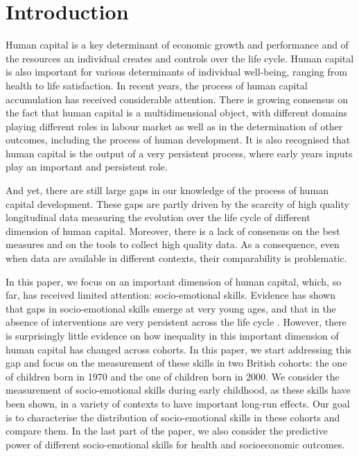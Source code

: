 \section{Introduction}

Human capital is a key determinant of economic growth and performance and of the resources an individual creates and controls over the life cycle. Human capital is also important for various determinants of individual well-being, ranging from health to life satisfaction.  In recent years, the process of human capital accumulation has received considerable attention. There is growing consensus on the fact that human capital is a multidimensional object, with different domains playing different roles in labour market as well as in the determination of other outcomes, including the process of human development. It is also recognised that human capital is the output of a very persistent process, where early years inputs play an important and persistent role.

And yet, there are still large gaps in our knowledge of the process of human capital development. These gaps are partly driven by the scarcity of high quality longitudinal data measuring the evolution over the life cycle of different dimension of human capital. Moreover, there is a lack of consensus on the best measures and on the tools to collect high quality data. As a consequence, even when data are available in different contexts, their comparability is problematic.

In this paper, we focus on an important dimension of human capital, which, so far, has received limited attention: socio-emotional skills. Evidence has shown that gaps in socio-emotional skills emerge at very young ages, and that in the absence of interventions are very persistent across the life cycle \citep{Cunha2006}. However, there is surprisingly little evidence on how inequality in this important dimension of human capital has changed across cohorts. In this paper, we start addressing this gap and focus on the measurement of these skills in two British cohorts: the one of children born in 1970 and the one of children born in 2000. We consider the measurement of socio-emotional skills during early childhood, as these skills have been shown, in a variety of contexts \citep{Almlund2011} to have important long-run effects. Our goal is to characterise the distribution of socio-emotional skills in these cohorts and compare them. In the last part of the paper, we also consider the predictive power of different socio-emotional skills for health and socioeconomic outcomes.

